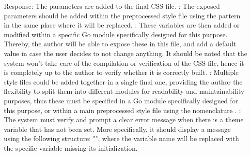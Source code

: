 {}Response: The parameters are added to the final CSS file.\markdownRendererInterblockSeparator
{}: The exposed parameters should be added within the preprocessed style file using the pattern  in the same place where it will be replaced.\markdownRendererInterblockSeparator
{}: These variables are then added or modified within a specific Go module specifically designed for this purpose. Thereby, the author will be able to expose these in this file, and add a default value in case the user decides to not change anything. It should be noted that the system won't take care of the compilation or verification of the CSS file, hence it is completely up to the author to verify whether it is correctly built.\markdownRendererInterblockSeparator
{}: Multiple style files could be added together in a single final one, providing the author the flexibility to split them into different modules for readability and maintainability purposes, thus these must be specified in a Go module specifically designed for this purpose, or within a main preprocessed style file using the nomenclature .\markdownRendererInterblockSeparator
{}: The system must verify and prompt a clear error message when there is a theme variable that has not been set. More specifically, it should display a message using the following structure: "", where the variable name will be replaced with the specific variable missing its initialization. \markdownRendererDocumentEnd